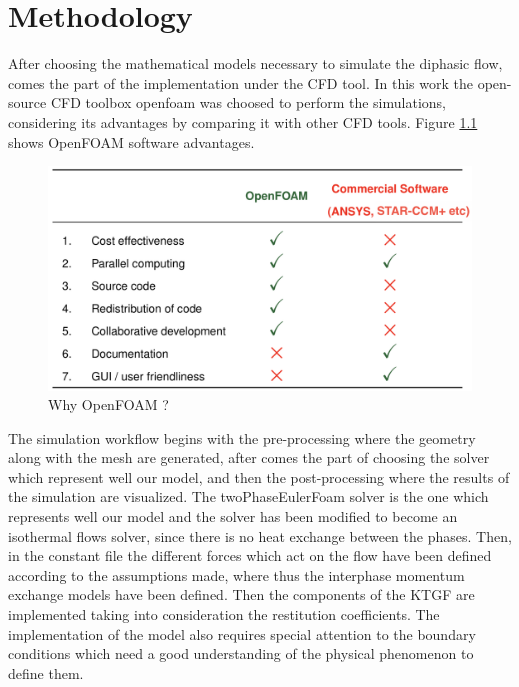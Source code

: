 \documentclass[11pt]{report}
\begin{document}
 \chapter{Methodology}
 After choosing the mathematical models necessary to simulate the diphasic flow, comes the part of the implementation under the CFD tool. 
 In this work the open-source CFD toolbox openfoam was choosed to perform the simulations, considering its advantages by comparing it with other CFD tools.
  Figure \ref{openfoam} shows OpenFOAM software advantages.\\
\begin{figure}[ht!]
 \begin{center}
 \includegraphics[trim=0cm 0cm 0cm 0cm,clip,scale=0.45]{figs/0F2.png}
 \caption{ Why OpenFOAM ?}
 \label{openfoam}
 \end{center}
 \end{figure} 
 The simulation workflow begins with the pre-processing where the geometry along with the mesh are generated, 
 after comes the part of choosing the solver which represent well our model, and then the post-processing where the results of the simulation are visualized.
%
The twoPhaseEulerFoam solver is the one which represents well our model and  the solver has been modified to become an isothermal flows solver, since there is no heat exchange between the phases. 
%
Then, in the constant file the different forces which act on the flow have been defined according to the assumptions made, where thus the interphase momentum exchange models have been defined.
%
 Then the components of the KTGF are implemented taking into consideration the restitution coefficients. 
 The implementation of the model also requires special attention to the boundary conditions which need a good understanding of the physical phenomenon to define them.
\end{document}
